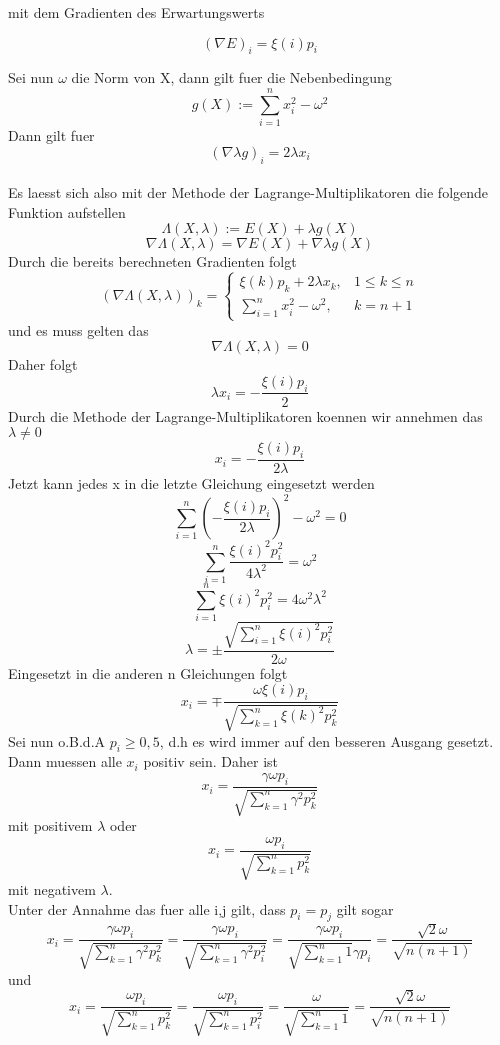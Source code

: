 \documentclass[11pt]{scrartcl}
\begin{document}
			mit dem Gradienten des Erwartungswerts
			\begin{center}
				\[(\nabla E)_{i}=\xi(i)p_{i}\]
			\end{center}
			Sei nun \(\omega\) die Norm von X, dann gilt fuer die Nebenbedingung
			\[g(X):=\sum_{i=1}^{n}x_{i}^2-{\omega}^2\]
			Dann gilt fuer \[(\nabla \lambda g)_{i} = 2\lambda x_{i}\]\\
			Es laesst sich also mit der Methode der Lagrange-Multiplikatoren die folgende Funktion aufstellen \[\Lambda(X,\lambda) := E(X)+\lambda g(X)\]
			\[\nabla \Lambda(X,\lambda) = \nabla E(X) + \nabla \lambda g(X)\]
			Durch die bereits berechneten Gradienten folgt
			\[(\nabla \Lambda (X,\lambda))_{k}=
				\begin{cases}
					\xi (k)p_{k}+2\lambda x_{k}, & 1\leq k\leq n\\
					\sum_{i=1}^{n}x_{i}^2-\omega^2, & k = n+1
				\end{cases}\]
			und es muss gelten das
			\[\nabla \Lambda(X,\lambda)=0\]
			Daher folgt
			\[\lambda x_{i} = -\frac{\xi(i)p_{i}}{2}\]
			Durch die Methode der Lagrange-Multiplikatoren koennen wir annehmen das \(\lambda \neq 0\)
			\[x_{i}= -\frac{\xi(i)p_{i}}{2\lambda}\]
			Jetzt kann jedes x in die letzte Gleichung eingesetzt werden
			\[\sum_{i=1}^{n}(-\frac{\xi(i)p_{i}}{2\lambda})^2-\omega^2=0\]
			\[\sum_{i=1}^{n}\frac{\xi(i)^2p_{i}^2}{4\lambda^2}=\omega^2\]
			\[\sum_{i=1}^{n}\xi(i)^2p_{i}^2=4\omega^2\lambda^2\]
			\[\lambda = \pm\frac{\sqrt{\sum_{i=1}^{n}\xi(i)^2p_{i}^2}}{2\omega}\]
			Eingesetzt in die anderen n Gleichungen folgt
			\[x_{i}=\mp\frac{\omega\xi(i)p_{i}}{\sqrt{\sum_{k=1}^{n}\xi(k)^2p_{k}^2}}\]
			Sei nun o.B.d.A \(p_{i}\geq0,5\), d.h es wird immer auf den besseren Ausgang gesetzt. Dann muessen alle \(x_{i}\) positiv sein. Daher ist
			$$
			x_{i}=\frac{\gamma\omega p_{i}}{\sqrt{\sum_{k=1}^{n}\gamma^2p_{k}^2}}
			$$
			mit positivem \(\lambda\) oder
			$$
			x_{i}=\frac{\omega p_{i}}{\sqrt{\sum_{k=1}^{n}p_{k}^2}}
			$$
			mit negativem \(\lambda\). \\
			Unter der Annahme das fuer alle i,j gilt, dass \(p_{i}=p_{j}\) gilt sogar
			$$
			x_{i}=\frac{\gamma\omega p_{i}}{\sqrt{\sum_{k=1}^{n}\gamma^2p_{k}^2}}=\frac{\gamma\omega p_{i}}{\sqrt{\sum_{k=1}^{n}\gamma^2p_{i}^2}}=\frac{\gamma\omega p_{i}}{\sqrt{\sum_{k=1}^{n}1}\gamma p_{i}}=\frac{\sqrt{2}\omega}{\sqrt{n(n+1)}}
			$$
			und
			$$
			x_{i}=\frac{\omega p_{i}}{\sqrt{\sum_{k=1}^{n}p_{k}^2}}=\frac{\omega p_{i}}{\sqrt{\sum_{k=1}^{n}p_{i}^2}}=\frac{\omega }{\sqrt{\sum_{k=1}^{n}1}}=\frac{\sqrt{2}\omega}{\sqrt{n(n+1)}}
			$$\\
\end{document}
